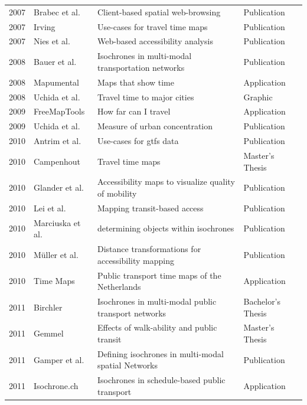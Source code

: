 \begin{table}[htp]
\begin{tabular}{r|l|l|l}
      2007 & Brabec et al. \cite{Brabec2007} & Client-based spatial web-browsing & Publication \\
      2007 & Irving \cite{Irving2007} & Use-cases for travel time maps & Publication \\
      2007 & Nies et al. \cite{neis2007webbasierte} & Web-based accessibility analysis & Publication \\
      2008 & Bauer et al. \cite{bauer2008computing} & Isochrones in multi-modal transportation networks & Publication \\
      2008 & Mapumental \cite{Mapumental} & Maps that show time & Application \\
      2008 & Uchida et al. \cite{Uchida2008} & Travel time to major cities & Graphic \\
      2009 & FreeMapTools \cite{Freemaptools} & How far can I travel & Application \\
      2009 & Uchida et al. \cite{uchida2009agglomeration} & Measure of urban concentration & Publication \\
      2010 & Antrim et al. \cite{antrim2013many} & Use-cases for \acrshort{gtfs} data & Publication \\
      2010 & Campenhout \cite{van2010travel} & Travel time maps & Master's Thesis \\
      2010 & Glander et al. \cite{Glander2010} & Accessibility maps to visualize quality of mobility & Publication \\
      2010 & Lei et al. \cite{lei2010mapping} & Mapping transit-based access & Publication \\
      2010 & Marciuska et al. \cite{marciuska2010determining} & determining objects within isochrones & Publication \\
      2010 & Müller et al. \cite{Mueller2010} & Distance transformations for accessibility mapping & Publication \\
      2010 & Time Maps \cite{TimeMaps} & Public transport time maps of the Netherlands & Application \\
      2011 & Birchler \cite{birchler2011computing} & Isochrones in multi-modal public transport networks & Bachelor's Thesis \\
      2011 & Gemmel \cite{gemmel2012hedonic} & Effects of walk-ability and public transit & Master's Thesis \\
      2011 & Gamper et al. \cite{gamper2011defining} & Defining isochrones in multi-modal spatial Networks & Publication \\
      2011 & Isochrone.ch \cite{IsochroneCh} & Isochrones in schedule-based public transport & Application \\

\end{tabular}
\end{table}
